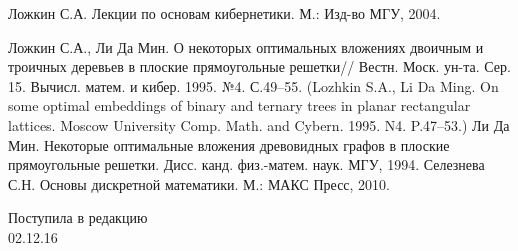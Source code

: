 \documentclass[12pt, a4paper]{article}
\theoremstyle{plain}
\theoremstyle{definition}
\theoremstyle{definition}
\begin{document}
\vspace{-1.5cm}
\renewcommand{\refname}{\begin{center}
{\normalsize \rm СПИСОК ЛИТЕРАТУРЫ} \end{center}}
\begin{thebibliography}{99}\itemsep=-2pt

  Ложкин С.А. Лекции по основам кибернетики. М.: Изд-во МГУ, 2004.
  
 Ложкин С.А., Ли Да Мин. О некоторых оптимальных вложениях двоичным и троичных деревьев в плоские прямоугольные решетки//
 Вестн. Моск. ун-та. Сер. 15. Вычисл. матем. и кибер. 1995. №4.
 С.49--55. (Lozhkin S.A., Li Da Ming. On some 
 optimal embeddings of binary and ternary trees in planar 
 rectangular lattices. Moscow University Comp. Math. and Cybern. 1995. N4. P.47--53.)
 Ли Да Мин. Некоторые оптимальные вложения древовидных графов в плоские прямоугольные решетки. Дисс. канд. физ.-матем. наук. МГУ, 1994.
Селезнева С.Н. Основы дискретной математики. М.: МАКС Пресс, 2010.
\end{thebibliography}

\begin{flushright}
Поступила в редакцию\\
02.12.16$\mspace{118mu}$
\end{flushright}
\end{document}
